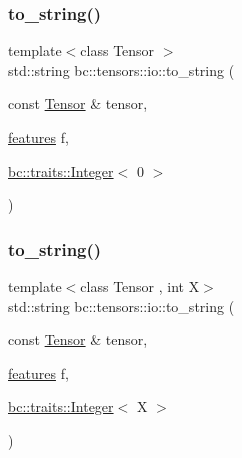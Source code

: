 \mbox{\label{namespacebc_1_1tensors_1_1io_a1659dd997f13b9fb9cb625abf93cb30b}} 
\subsubsection{\texorpdfstring{to\+\_\+string()}{to\_string()}\hspace{0.1cm}{\footnotesize\ttfamily [3/4]}}
{\footnotesize\ttfamily template$<$class Tensor $>$ \\
std\+::string bc\+::tensors\+::io\+::to\+\_\+string (\begin{DoxyParamCaption}\item[{const \hyperlink{namespacebc_a659391e47ab612be3ba6c18cf9c89159}{Tensor} \&}]{tensor,  }\item[{\hyperlink{structbc_1_1tensors_1_1io_1_1features}{features}}]{f,  }\item[{\hyperlink{structbc_1_1traits_1_1Integer}{bc\+::traits\+::\+Integer}$<$ 0 $>$}]{ }\end{DoxyParamCaption})}

\mbox{\label{namespacebc_1_1tensors_1_1io_ab53182c7c4ee1f7c38b1dcbd80e41fcd}} 
\subsubsection{\texorpdfstring{to\+\_\+string()}{to\_string()}\hspace{0.1cm}{\footnotesize\ttfamily [4/4]}}
{\footnotesize\ttfamily template$<$class Tensor , int X$>$ \\
std\+::string bc\+::tensors\+::io\+::to\+\_\+string (\begin{DoxyParamCaption}\item[{const \hyperlink{namespacebc_a659391e47ab612be3ba6c18cf9c89159}{Tensor} \&}]{tensor,  }\item[{\hyperlink{structbc_1_1tensors_1_1io_1_1features}{features}}]{f,  }\item[{\hyperlink{structbc_1_1traits_1_1Integer}{bc\+::traits\+::\+Integer}$<$ X $>$}]{ }\end{DoxyParamCaption})}

